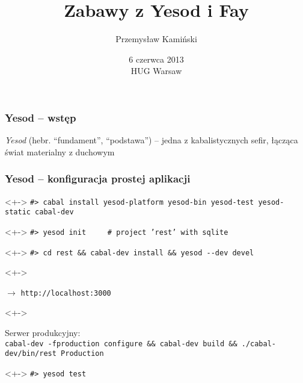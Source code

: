 \documentclass[landscape]{beamer}
\title[Zabawy z Yesod i Fay]{Zabawy z Yesod i Fay}
\author{Przemys\l{}aw Kami\'nski}
\date{6 czerwca 2013 \\ HUG Warsaw}
\begin{document}
\begin{frame}
  \titlepage
\end{frame}

\begin{frame}
  \frametitle{Yesod -- wst\k{e}p}
    \emph {Yesod} (hebr. ``fundament'', ``podstawa'') -- jedna z kabalistycznych
    sefir, \l{}\k{a}cz\k{a}ca \'swiat materialny z duchowym
    \uncover<+->{} 
\end{frame}

\begin{frame}
  \frametitle{Yesod -- konfiguracja prostej aplikacji}
  \begin{center}
  \end{center}
  \begin{uncoverenv}<+->
    \texttt{\#> cabal install yesod-platform yesod-bin yesod-test yesod-static
      cabal-dev}
  \end{uncoverenv}

  \begin{uncoverenv}<+->
    \texttt{\#> yesod init \ \ \ \ \# project 'rest' with sqlite}
  \end{uncoverenv}

  \begin{uncoverenv}<+->
    \texttt{\#> cd rest \&\& cabal-dev install \&\& yesod -{}-dev devel}
  \end{uncoverenv}
  
  \begin{uncoverenv}<+->
    \begin{center}
      $\longrightarrow$
      \texttt{http://localhost:3000}
    \end{center}
  \end{uncoverenv}

  \begin{uncoverenv}<+->
    \begin{center}
      Serwer produkcyjny: \\
      \texttt{cabal-dev -fproduction configure \&\& cabal-dev build \&\&
        ./cabal-dev/bin/rest Production}
    \end{center}
  \end{uncoverenv}

  \begin{uncoverenv}<+->
     \texttt{\#> yesod test}
  \end{uncoverenv}
\end{frame}
\end{document}
